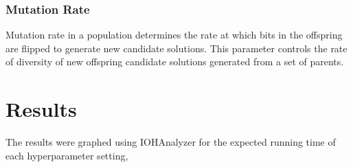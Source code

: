 \documentclass{article}
\begin{document}
\subsubsection{Mutation Rate}
Mutation rate in a population determines the rate at which bits in the offspring are flipped to generate new candidate solutions. This parameter controls the rate of diversity of new offspring candidate solutions generated from a set of parents.  





\section{Results}\label{sec:results}
The results were graphed using IOHAnalyzer \cite{IOHanalyzer} for the expected running time of each hyperparameter setting, 





\end{document}
